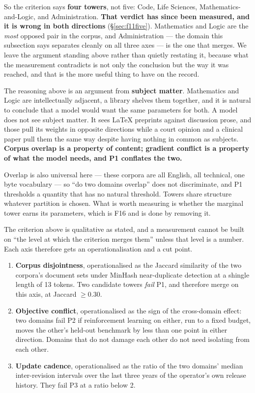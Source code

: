\documentclass[11pt]{article}
\begin{document}
So the criterion says \textbf{four towers}, not five: Code, Life Sciences, Mathematics-and-Logic, and Administration. \textbf{That verdict has since been measured, and it is wrong in both directions} (\S\ref{sec:f11five}). Mathematics and Logic are the \emph{most} opposed pair in the corpus, and Administration --- the domain this subsection says separates cleanly on all three axes --- is the one that merges. We leave the argument standing above rather than quietly restating it, because what the measurement contradicts is not only the conclusion but the way it was reached, and that is the more useful thing to have on the record.

The reasoning above is an argument from \textbf{subject matter}. Mathematics and Logic are intellectually adjacent, a library shelves them together, and it is natural to conclude that a model would want the same parameters for both. A model does not see subject matter. It sees LaTeX preprints against discussion prose, and those pull its weights in opposite directions while a court opinion and a clinical paper pull them the same way despite having nothing in common as subjects. \textbf{Corpus overlap is a property of content; gradient conflict is a property of what the model needs, and P1 conflates the two.}

Overlap is also universal here --- these corpora are all English, all technical, one byte vocabulary --- so ``do two domains overlap'' does not discriminate, and P1 thresholds a quantity that has no natural threshold. Towers share structure whatever partition is chosen. What is worth measuring is whether the marginal tower earns its parameters, which is F16 and is done by removing it.

The criterion above is qualitative as stated, and a measurement cannot be built on ``the level at which the criterion merges them'' unless that level is a number. Each axis therefore gets an operationalisation and a cut point.

\begin{enumerate}[label=(P\arabic*),itemsep=2pt]
\item \textbf{Corpus disjointness}, operationalised as the Jaccard similarity of the two corpora's document sets under MinHash near-duplicate detection at a shingle length of 13 tokens. Two candidate towers \emph{fail} P1, and therefore merge on this axis, at Jaccard $\geq 0.30$.
\item \textbf{Objective conflict}, operationalised as the sign of the cross-domain effect: two domains fail P2 if reinforcement learning on either, run to a fixed budget, moves the other's held-out benchmark by less than one point in either direction. Domains that do not damage each other do not need isolating from each other.
\item \textbf{Update cadence}, operationalised as the ratio of the two domains' median inter-revision intervals over the last three years of the operator's own release history. They fail P3 at a ratio below 2.
\end{enumerate}
\end{document}
